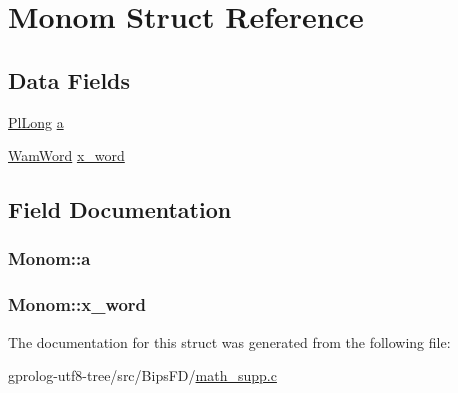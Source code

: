 \hypertarget{structMonom}{}\section{Monom Struct Reference}
\label{structMonom}
\subsection*{Data Fields}
\begin{DoxyCompactItemize}
\item 
\hyperlink{gprolog_8h_a4d005b136d7fb28537eb1815f7868b63}{Pl\+Long} \hyperlink{structMonom_a65b12a1274c4471fce35332ef4bb84f6}{a}
\item 
\hyperlink{LINUX__SIGSEGV_8c_a10ea8be8823feb38875b8a9326cbb424}{Wam\+Word} \hyperlink{structMonom_a72cc88b43a8727f47d9e50db2cda700f}{x\+\_\+word}
\end{DoxyCompactItemize}


\subsection{Field Documentation}
\subsubsection[{\texorpdfstring{a}{a}}]{ Monom\+::a}\hypertarget{structMonom_a65b12a1274c4471fce35332ef4bb84f6}{}\label{structMonom_a65b12a1274c4471fce35332ef4bb84f6}
\subsubsection[{\texorpdfstring{x\+\_\+word}{x_word}}]{ Monom\+::x\+\_\+word}\hypertarget{structMonom_a72cc88b43a8727f47d9e50db2cda700f}{}\label{structMonom_a72cc88b43a8727f47d9e50db2cda700f}


The documentation for this struct was generated from the following file\+:\begin{DoxyCompactItemize}
\item 
gprolog-\/utf8-\/tree/src/\+Bips\+F\+D/\hyperlink{math__supp_8c}{math\+\_\+supp.\+c}\end{DoxyCompactItemize}
